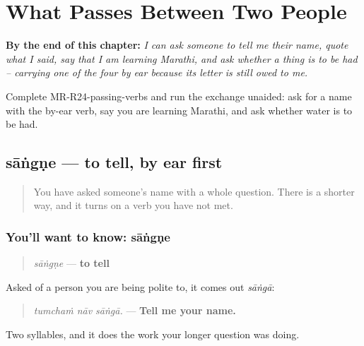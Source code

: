 
\chapter{What Passes Between Two People}
\label{ch:mr-passing-verbs}

\begin{chapteropening}
\textbf{By the end of this chapter:} \emph{I can ask someone to tell me their name, quote what I said, say that I am learning Marathi, and ask whether a thing is to be had -- carrying one of the four by ear because its letter is still owed to me.}

Complete MR-R24-passing-verbs and run the exchange unaided: ask for a name with the by-ear verb, say you are learning Marathi, and ask whether water is to be had.
\end{chapteropening}

\section[sāṅgṇe]{sāṅgṇe — to tell, by ear first}

\label{lesson:MR-C24-sangne}



\begin{quote}
You have asked someone's name with a whole question. There is a shorter way, and it turns on a verb you have not met.
\end{quote}

\subsection*{You'll want to know: sāṅgṇe}
\begin{quote}
\emph{sāṅgṇe} — \textbf{to tell}
\end{quote}

Asked of a person you are being polite to, it comes out \emph{sāṅgā}:

\begin{quote}
\emph{tumchaṁ nāv sāṅgā.} — \textbf{Tell me your name.}
\end{quote}

Two syllables, and it does the work your longer question was doing.

